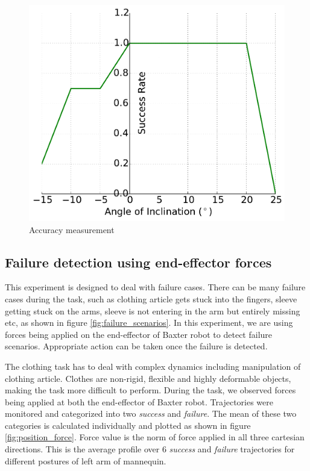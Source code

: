 \documentclass[sigconf]{acmart}
\begin{document}
\begin{figure}
	\centering
	\includegraphics[width=\linewidth]{success_rate}
	\caption{Accuracy measurement}
	\label{fig:accuracy}
\end{figure}

\subsection{Failure detection using end-effector forces}
This experiment is designed to deal with failure cases. There can be many failure cases during the task, such as clothing article gets stuck into the fingers, sleeve getting stuck on the arms, sleeve is not entering in the arm but entirely missing etc, as shown in figure \ref{fig:failure_scenarios}. In this experiment, we are using forces being applied on the end-effector of Baxter robot to detect failure scenarios. Appropriate action can be taken once the failure is detected.

The clothing task has to deal with complex dynamics including manipulation of clothing article. Clothes are non-rigid, flexible and highly deformable objects, making the task more difficult to perform. During the task, we observed forces being applied at both the end-effector of Baxter robot. Trajectories were monitored and categorized into two \textit{success} and \textit{failure}. The mean of these two categories is calculated individually and plotted as shown in figure \ref{fig:position_force}. Force value is the norm of force applied in all three cartesian directions. This is the average profile over 6 \textit{success} and \textit{failure} trajectories for different postures of left arm of mannequin.
\end{document}
